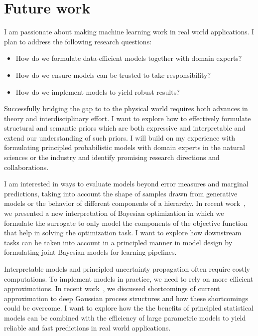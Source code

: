 \section{Future work}
I am passionate about making machine learning work in real world applications.
I plan to address the following research questions:
\begin{itemize}
    \item How do we formulate data-efficient models together with domain experts?
    \item How do we ensure models can be trusted to take responsibility?
    \item How do we implement models to yield robust results?
\end{itemize}
Successfully bridging the gap to to the physical world requires both advances in theory and interdisciplinary effort.
I want to explore how to effectively formulate structural and semantic priors which are both expressive and interpretable and extend our understanding of such priors.
I will build on my experience with formulating principled probabilistic models with domain experts in the natural sciences or the industry and identify promising research directions and collaborations.

I am interested in ways to evaluate models beyond error measures and marginal predictions, taking into account the shape of samples drawn from generative models or the behavior of different components of a hierarchy.
In recent work~\parencite{bodin_modulating_2020}, we presented a new interpretation of Bayesian optimization in which we formulate the surrogate to only model the components of the objective function that help in solving the optimization task.
I want to explore how downstream tasks can be taken into account in a principled manner in model design by formulating joint Bayesian models for learning pipelines.

Interpretable models and principled uncertainty propagation often require costly computations.
To implement models in practice, we need to rely on more efficient approximations.
In recent work~\parencite{ustyuzhaninov_compositional_2020}, we discussed shortcomings of current approximation to deep Gaussian process structures and how these shortcomings could be overcome.
I want to explore how the the benefits of principled statistical models can be combined with the efficiency of large parametric models to yield reliable and fast predictions in real world applications.

